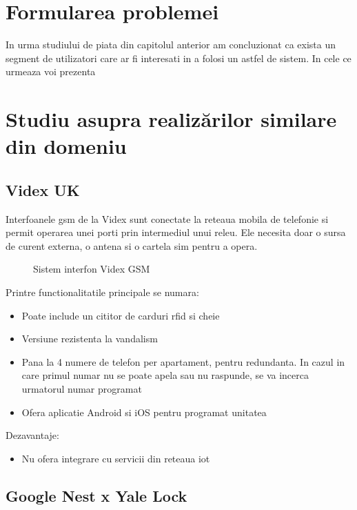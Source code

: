 \section {Formularea problemei}

In urma studiului de piata din capitolul anterior am concluzionat ca exista un segment de utilizatori care ar fi interesati in a folosi un astfel de sistem. In cele ce urmeaza voi prezenta 

\section {Studiu asupra realizărilor similare din domeniu}


\subsection {Videx UK}

Interfoanele \acrshort{gsm} de la Videx sunt conectate la reteaua mobila de telefonie si permit operarea unei porti prin intermediul unui releu. Ele necesita doar o sursa de curent externa, o antena si o cartela \acrfull{sim} pentru a opera.

\begin{figure}[h!]
  \centering
  \caption{Sistem interfon Videx GSM \cite{VidexUk}}
\end{figure}

Printre functionalitatile principale se numara:
\begin{itemize}
  \item Poate include un cititor de carduri \acrshort{rfid} si cheie
  \item Versiune rezistenta la vandalism
  \item Pana la 4 numere de telefon per apartament, pentru redundanta. In cazul in care primul numar nu se poate apela sau nu raspunde, se va incerca urmatorul numar programat
  \item Ofera aplicatie Android si iOS pentru programat unitatea
\end{itemize}

Dezavantaje:

\begin{itemize}
  \item Nu ofera integrare cu servicii din reteaua \acrshort{iot}
\end{itemize}

\subsection {Google Nest x Yale Lock}

